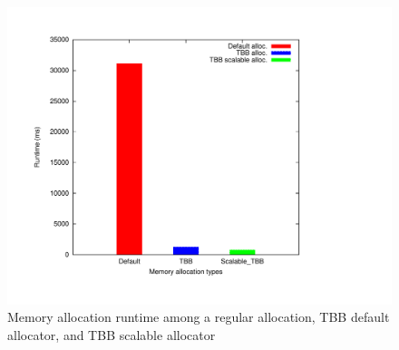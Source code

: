 \begin{figure}
	\centering
  	\includegraphics[scale=0.3]{../plots/mem_alloc/mem_alloc.pdf}
	\caption{Memory allocation runtime among a regular allocation, TBB default allocator, and TBB scalable allocator}
	\label{fig:mem_alloc}
\end{figure}
